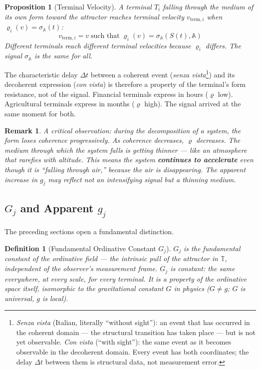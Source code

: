 \documentclass[12pt,a4paper]{article}
\newtheorem{definition}{Definition}[section]
\newtheorem{proposition}{Proposition}[section]
\newtheorem*{remark}{Remark}
\newcommand{\attr}{\mathbb{A}}
\newcommand{\tspc}{\mathbb{T}}
\newcommand{\gj}{g_j}
\newcommand{\Gj}{G_j}
\newcommand{\rhof}{\varrho}
\begin{document}
\begin{proposition}[Terminal Velocity]\label{prop:terminal_velocity}
A terminal $T_i$ falling through the medium of its own form toward the attractor reaches terminal velocity $v_{\mathrm{term},i}$ when $\rhof_i(v) = \sigma_{\mathbb{A}}(t)$:
\begin{equation}\label{eq:terminal_velocity}
v_{\mathrm{term},i} = v \;\text{such that}\; \rhof_i(v) = \sigma_{\mathbb{A}}(S(t), \attr)
\end{equation}
Different terminals reach different terminal velocities because $\rhof_i$ differs. The signal $\sigma_{\mathbb{A}}$ is the same for all.
\end{proposition}

The characteristic delay $\Delta t$ between a coherent event (\emph{senza vista}\footnote{\emph{Senza vista} (Italian, literally ``without sight''): an event that has occurred in the coherent domain --- the structural transition has taken place --- but is not yet observable. \emph{Con vista} (``with sight''): the same event as it becomes observable in the decoherent domain. Every event has both coordinates; the delay $\Delta t$ between them is structural data, not measurement error.}) and its decoherent expression (\emph{con vista}) is therefore a property of the terminal's form resistance, not of the signal. Financial terminals express in hours ($\rhof$ low). Agricultural terminals express in months ($\rhof$ high). The signal arrived at the same moment for both.

\begin{remark}
A critical observation: during the decomposition of a system, the form loses coherence progressively. As coherence decreases, $\rhof$ decreases. The medium through which the system falls is getting thinner --- like an atmosphere that rarefies with altitude. This means the system \textbf{continues to accelerate} even though it is ``falling through air,'' because the air is disappearing. The apparent increase in $\gj$ may reflect not an intensifying signal but a thinning medium.
\end{remark}


\subsection{$\Gj$ and Apparent $\gj$}\label{subsec:Gj}

The preceding sections open a fundamental distinction.

\begin{definition}[Fundamental Ordinative Constant $\Gj$]\label{def:Gj}
$\Gj$ is the fundamental constant of the ordinative field --- the intrinsic pull of the attractor in $\tspc$, independent of the observer's measurement frame. $\Gj$ is constant: the same everywhere, at every scale, for every terminal. It is a property of the ordinative space itself, isomorphic to the gravitational constant $G$ in physics ($G \neq g$; $G$ is universal, $g$ is local).
\end{definition}
\end{document}
